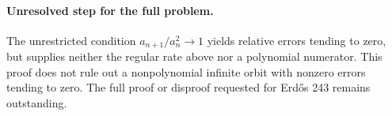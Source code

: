 \documentclass[11pt]{article}
\begin{document}
\paragraph{Unresolved step for the full problem.}
The unrestricted condition $a_{n+1}/a_n^2\to1$ yields relative errors
tending to zero, but supplies neither the regular rate above nor a
polynomial numerator. This proof does not rule out a nonpolynomial
infinite orbit with nonzero errors tending to zero. The full proof or
disproof requested for Erd\H{o}s 243 remains outstanding.
\end{document}
